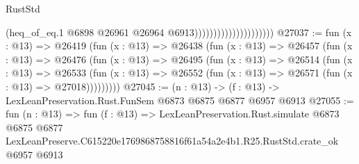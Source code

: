 \begin{lexlean}{RustStd}
\begin{coremodule}
                                            (heq_of_eq.{1}
                                              @6898
                                              @26961
                                              @26964
                                              @6913)))))))))))))))))))))
@27037 := fun (x : @13) =>
  @26419
    (fun (x : @13) =>
    @26438
      (fun (x : @13) =>
      @26457
        (fun (x : @13) =>
        @26476
          (fun (x : @13) =>
          @26495
            (fun (x : @13) =>
            @26514
              (fun (x : @13) =>
              @26533
                (fun (x : @13) => @26552 (fun (x : @13) => @26571 (fun (x : @13) => @27018)))))))))
@27045 := (n : @13) -> (f : @13) -> LexLeanPreservation.Rust.FunSem @6873 @6875 @6877 @6957 @6913
@27055 := fun (n : @13) =>
  fun (f : @13) =>
  LexLeanPreservation.Rust.simulate
    @6873
    @6875
    @6877
    LexLeanPreserve.C615220e1769868758816f61a54a2e4b1.R25.RustStd.crate_ok
    @6957
    @6913
\end{coremodule}
\end{lexlean}
